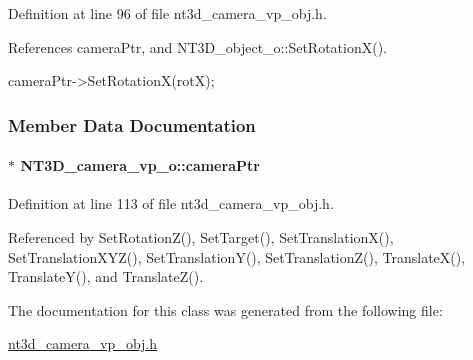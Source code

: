 Definition at line 96 of file nt3d\_\-camera\_\-vp\_\-obj.h.



References cameraPtr, and NT3D\_\-object\_\-o::SetRotationX().




\begin{DoxyCode}
{ cameraPtr->SetRotationX(rotX); }
\end{DoxyCode}




\subsubsection{Member Data Documentation}
\paragraph[{cameraPtr}]{$\ast$ {\bf NT3D\_\-camera\_\-vp\_\-o::cameraPtr}}\hfill\label{class_n_t3_d__camera__vp__o_a65b1a65c8c7ed200a010152ab69413db}


Definition at line 113 of file nt3d\_\-camera\_\-vp\_\-obj.h.



Referenced by SetRotationZ(), SetTarget(), SetTranslationX(), SetTranslationXYZ(), SetTranslationY(), SetTranslationZ(), TranslateX(), TranslateY(), and TranslateZ().



The documentation for this class was generated from the following file:\begin{DoxyCompactItemize}
\item 
\hyperlink{nt3d__camera__vp__obj_8h}{nt3d\_\-camera\_\-vp\_\-obj.h}\end{DoxyCompactItemize}

